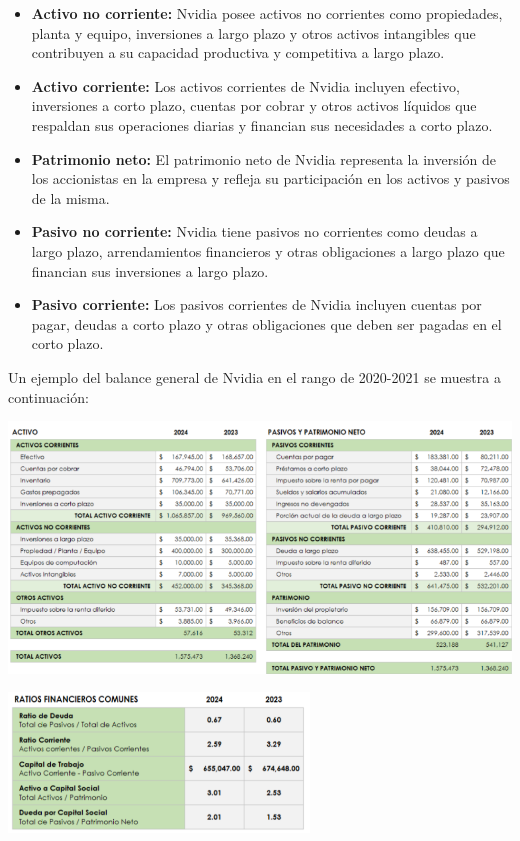 \documentclass{article}
\begin{document}
\begin{itemize}
  \item \textbf{Activo no corriente:} Nvidia posee activos no corrientes como propiedades, planta y equipo, inversiones a largo plazo y otros activos intangibles que contribuyen a su capacidad productiva y competitiva a largo plazo.
  \item \textbf{Activo corriente:} Los activos corrientes de Nvidia incluyen efectivo, inversiones a corto plazo, cuentas por cobrar y otros activos líquidos que respaldan sus operaciones diarias y financian sus necesidades a corto plazo.
  \item \textbf{Patrimonio neto:} El patrimonio neto de Nvidia representa la inversión de los accionistas en la empresa y refleja su participación en los activos y pasivos de la misma.
  \item \textbf{Pasivo no corriente:} Nvidia tiene pasivos no corrientes como deudas a largo plazo, arrendamientos financieros y otras obligaciones a largo plazo que financian sus inversiones a largo plazo.
  \item \textbf{Pasivo corriente:} Los pasivos corrientes de Nvidia incluyen cuentas por pagar, deudas a corto plazo y otras obligaciones que deben ser pagadas en el corto plazo.
\end{itemize}

Un ejemplo del balance general de Nvidia en el rango de 2020-2021 se muestra a continuación:

\begin{center}
  \includegraphics[width=15cm]{./assets/balance.png}
\end{center}
\begin{center}
  \includegraphics[width=8cm]{./assets/ratios_financieros.png}
\end{center}
\end{document}
